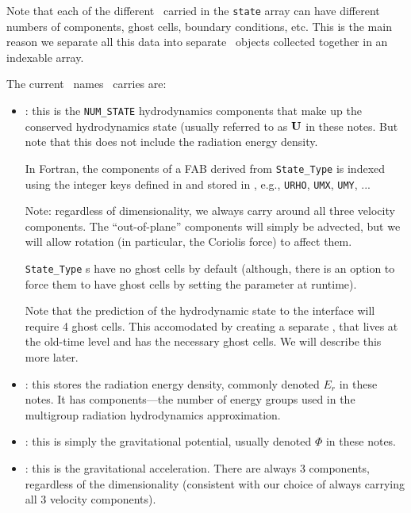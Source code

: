 Note that each of the different \statedata\ carried in the {\tt state}
array can have different numbers of components, ghost cells, boundary
conditions, etc.  This is the main reason we separate all this data
into separate \statedata\ objects collected together in an indexable
array.

The current \statedata\ names  \castro\ carries are:
\begin{itemize}
\item {} : this is the {\tt NUM\_STATE} hydrodynamics
  components that make up the conserved hydrodynamics state (usually
  referred to as ${\bf U}$ in these notes.  But note that this does
  not include the radiation energy density.

  In Fortran, the components of a FAB derived from {\tt State\_Type}
  is indexed using the integer keys defined in 
  and stored in , e.g., {\tt URHO}, {\tt UMX},
  {\tt UMY}, ...

  Note: regardless of dimensionality, we always carry around all
  three velocity components.  The ``out-of-plane'' components
  will simply be advected, but we will allow rotation (in particular,
  the Coriolis force) to affect them.

  {\tt State\_Type} \multifab s have no ghost cells by default
  (although, there is an option to force them to have ghost cells by
  setting the parameter  at runtime).

  Note that the prediction of the hydrodynamic state to the interface
  will require 4 ghost cells.  This accomodated by creating a separate
  \multifab,  that lives at the old-time level and
  has the necessary ghost cells.  We will describe this more later.

\item {} : this stores the radiation energy density,
  commonly denoted $E_r$ in these notes.  It has 
  components---the number of energy groups used in the multigroup
  radiation hydrodynamics approximation. 

\item {} : this is simply the gravitational
  potential, usually denoted $\Phi$ in these notes.

\item {} : this is the gravitational
  acceleration. There are always 3 components, regardless of the
  dimensionality (consistent with our choice of always carrying all 3
  velocity components).


\end{itemize}
